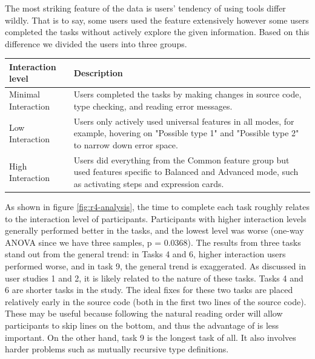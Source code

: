 The most striking feature of the data is users' tendency of using tools differ wildly. That is to say, some users used the feature extensively however some users completed the tasks without actively explore the given information. Based on this difference we divided the users into three groups.

\begin{tabularx}{\linewidth}{ 
  | >{\raggedright\arraybackslash}X 
  | >{\raggedright\arraybackslash}X  | }

    \hline
        Interaction level & Description \\ \hline
        Minimal Interaction & Users completed the tasks by making changes in source code, type checking, and reading error messages. \\ \hline
        Low Interaction & Users only actively used universal features in all modes, for example, hovering on "Possible type 1" and "Possible type 2" to narrow down error space. \\ \hline
        High Interaction & Users did everything from the Common feature group but used features specific to Balanced and Advanced mode, such as activating steps and expression cards. \\ \hline

\end{tabularx}



As shown in  figure \ref{fig:r4-analysis}, the time to complete each task roughly relates to the interaction level of participants. Participants with higher interaction levels generally performed better in the tasks, and the lowest level was worse (one-way ANOVA since we have three samples, p = 0.0368). The results from three tasks stand out from the general trend: in Tasks 4 and 6, higher interaction users performed worse, and in task 9, the general trend is exaggerated. As discussed in user studies 1 and 2, it is likely related to the nature of these tasks. Tasks 4 and 6 are shorter tasks in the study. The ideal fixes for these two tasks are placed relatively early in the source code (both in the first two lines of the source code). These may be useful because following the natural reading order will allow participants to skip lines on the bottom, and thus the advantage of \chameleon{} is less important. On the other hand, task 9 is the longest task of all. It also involves harder problems such as mutually recursive type definitions.

